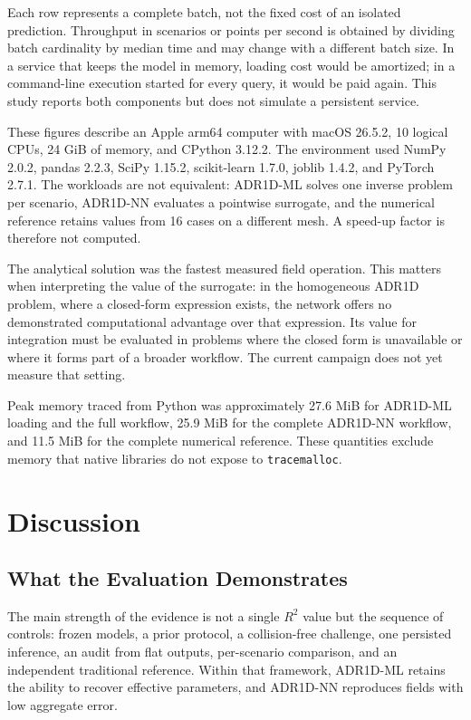 \documentclass[11pt,a4paper]{article}
\newcommand{\code}[1]{\texttt{#1}}
\begin{document}
Each row represents a complete batch, not the fixed cost of an isolated
prediction. Throughput in scenarios or points per second is obtained by
dividing batch cardinality by median time and may change with a different batch
size. In a service that keeps the model in memory, loading cost would be
amortized; in a command-line execution started for every query, it would be
paid again. This study reports both components but does not simulate a
persistent service.

These figures describe an Apple arm64 computer with macOS 26.5.2, 10 logical
CPUs, 24 GiB of memory, and CPython 3.12.2. The environment used NumPy 2.0.2,
pandas 2.2.3, SciPy 1.15.2, scikit-learn 1.7.0, joblib 1.4.2, and PyTorch 2.7.1.
The workloads are not equivalent: ADR1D-ML solves one inverse problem per
scenario, ADR1D-NN evaluates a pointwise surrogate, and the numerical reference
retains values from 16 cases on a different mesh. A speed-up factor is
therefore not computed.

The analytical solution was the fastest measured field operation. This
matters when interpreting the value of the surrogate: in the homogeneous ADR1D
problem, where a closed-form expression exists, the network offers no
demonstrated computational advantage over that expression. Its value for
integration must be evaluated in problems where the closed form is unavailable
or where it forms part of a broader workflow. The current campaign does not yet
measure that setting.

Peak memory traced from Python was approximately 27.6 MiB for ADR1D-ML loading
and the full workflow, 25.9 MiB for the complete ADR1D-NN workflow, and 11.5 MiB
for the complete numerical reference. These quantities exclude memory that
native libraries do not expose to \code{tracemalloc}.

\section{Discussion}

\subsection{What the Evaluation Demonstrates}

The main strength of the evidence is not a single $R^2$ value but the sequence
of controls: frozen models, a prior protocol, a collision-free challenge, one
persisted inference, an audit from flat outputs, per-scenario comparison, and
an independent traditional reference. Within that framework, ADR1D-ML retains
the ability to recover effective parameters, and ADR1D-NN reproduces fields
with low aggregate error.
\end{document}
